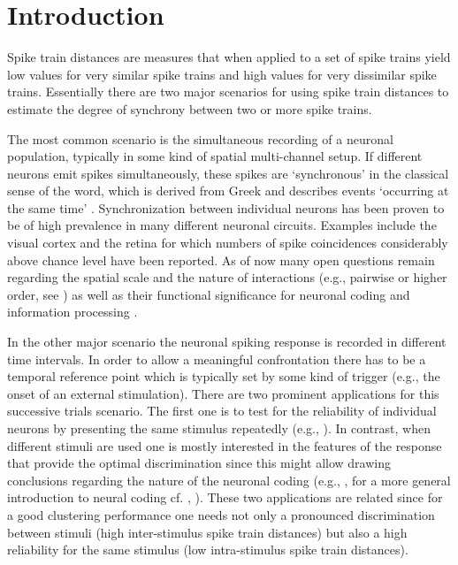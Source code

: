 \documentclass[10pt,twocolumn]{elsart5p}
\begin{document}
\section{\label{s:Intro} Introduction}

Spike train distances are measures that when applied to a set of spike trains yield low values for very similar spike trains and high values for very dissimilar spike trains. Essentially there are two major scenarios for using spike train distances to estimate the degree of synchrony between two or more spike trains.

The most common scenario is the simultaneous recording of a neuronal population, typically in some kind of spatial multi-channel setup. If different neurons emit spikes simultaneously, these spikes are `synchronous' in the classical sense of the word, which is derived from Greek and describes events `occurring at the same time' \citep{Pikovsky01}. Synchronization between individual neurons has been proven to be of high prevalence in many different neuronal circuits. Examples include the visual cortex \citep{Tiesinga08} and the retina \citep{Shlens08} for which numbers of spike coincidences considerably above chance level have been reported. As of now many open questions remain regarding the spatial scale and the nature of interactions (e.g., pairwise or higher order, see \citep{Nirenberg07}) as well as their functional significance for neuronal coding and information processing \citep{Kumar10}.

In the other major scenario the neuronal spiking response is recorded in different time intervals. In order to allow a meaningful confrontation there has to be a temporal reference point which is typically set by some kind of trigger (e.g., the onset of an external stimulation). There are two prominent applications for this successive trials scenario. The first one is to test for the reliability of individual neurons by presenting the same stimulus repeatedly (e.g., \citet{Mainen95}). In contrast, when different stimuli are used one is mostly interested in the features of the response that provide the optimal discrimination since this might allow drawing conclusions regarding the nature of the neuronal coding (e.g., \citet{Victor05}, for a more general introduction to neural coding cf. \citeauthor{QuianQuiroga02b}, \citeyear{QuianQuiroga02b}). These two applications are related since for a good clustering performance one needs not only a pronounced discrimination between stimuli (high inter-stimulus spike train distances) but also a high reliability for the same stimulus (low intra-stimulus spike train distances).
\end{document}
